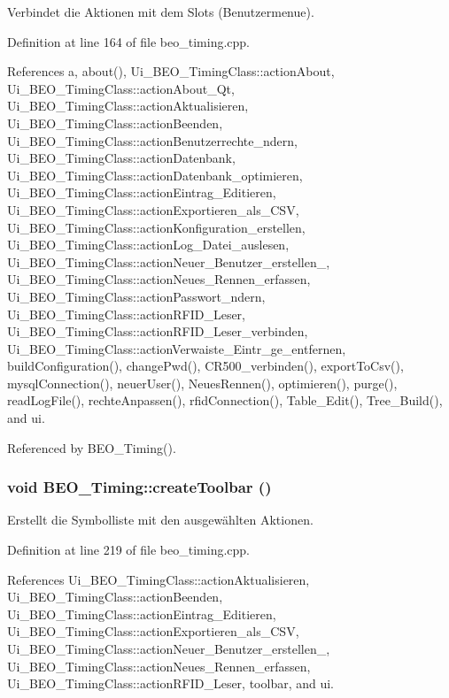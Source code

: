 Verbindet die Aktionen mit dem Slots (Benutzermenue). 



Definition at line 164 of file beo\_\-timing.cpp.

References a, about(), Ui\_\-BEO\_\-TimingClass::actionAbout, Ui\_\-BEO\_\-TimingClass::actionAbout\_\-Qt, Ui\_\-BEO\_\-TimingClass::actionAktualisieren, Ui\_\-BEO\_\-TimingClass::actionBeenden, Ui\_\-BEO\_\-TimingClass::actionBenutzerrechte\_\-ndern, Ui\_\-BEO\_\-TimingClass::actionDatenbank, Ui\_\-BEO\_\-TimingClass::actionDatenbank\_\-optimieren, Ui\_\-BEO\_\-TimingClass::actionEintrag\_\-Editieren, Ui\_\-BEO\_\-TimingClass::actionExportieren\_\-als\_\-CSV, Ui\_\-BEO\_\-TimingClass::actionKonfiguration\_\-erstellen, Ui\_\-BEO\_\-TimingClass::actionLog\_\-Datei\_\-auslesen, Ui\_\-BEO\_\-TimingClass::actionNeuer\_\-Benutzer\_\-erstellen\_, Ui\_\-BEO\_\-TimingClass::actionNeues\_\-Rennen\_\-erfassen, Ui\_\-BEO\_\-TimingClass::actionPasswort\_\-ndern, Ui\_\-BEO\_\-TimingClass::actionRFID\_\-Leser, Ui\_\-BEO\_\-TimingClass::actionRFID\_\-Leser\_\-verbinden, Ui\_\-BEO\_\-TimingClass::actionVerwaiste\_\-Eintr\_\-ge\_\-entfernen, buildConfiguration(), changePwd(), CR500\_\-verbinden(), exportToCsv(), mysqlConnection(), neuerUser(), NeuesRennen(), optimieren(), purge(), readLogFile(), rechteAnpassen(), rfidConnection(), Table\_\-Edit(), Tree\_\-Build(), and ui.

Referenced by BEO\_\-Timing().\hypertarget{class_b_e_o___timing_7f935167b5af6676da6cf85084118575}{
\subsubsection[createToolbar]{\setlength{\rightskip}{0pt plus 5cm}void BEO\_\-Timing::createToolbar ()}}
\label{class_b_e_o___timing_7f935167b5af6676da6cf85084118575}


Erstellt die Symbolliste mit den ausgewählten Aktionen. 



Definition at line 219 of file beo\_\-timing.cpp.

References Ui\_\-BEO\_\-TimingClass::actionAktualisieren, Ui\_\-BEO\_\-TimingClass::actionBeenden, Ui\_\-BEO\_\-TimingClass::actionEintrag\_\-Editieren, Ui\_\-BEO\_\-TimingClass::actionExportieren\_\-als\_\-CSV, Ui\_\-BEO\_\-TimingClass::actionNeuer\_\-Benutzer\_\-erstellen\_, Ui\_\-BEO\_\-TimingClass::actionNeues\_\-Rennen\_\-erfassen, Ui\_\-BEO\_\-TimingClass::actionRFID\_\-Leser, toolbar, and ui.


